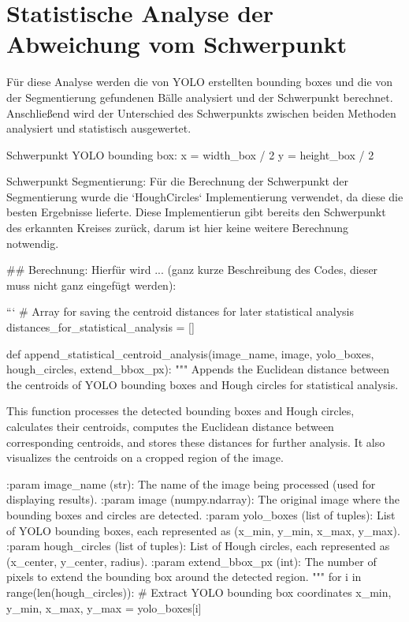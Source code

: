 \section{Statistische Analyse der Abweichung vom Schwerpunkt}

Für diese Analyse werden die von YOLO erstellten bounding boxes und die von der Segmentierung gefundenen Bälle analysiert und der Schwerpunkt berechnet. Anschließend wird der Unterschied des Schwerpunkts zwischen beiden Methoden analysiert und statistisch ausgewertet.

Schwerpunkt YOLO bounding box:
x = width_box / 2
y = height_box / 2


Schwerpunkt Segmentierung:
Für die Berechnung der Schwerpunkt der Segmentierung wurde die `HoughCircles` Implementierung verwendet, da diese die besten Ergebnisse lieferte. Diese Implementierun gibt bereits den Schwerpunkt des erkannten Kreises zurück, darum ist hier keine weitere Berechnung notwendig.


## Berechnung:
Hierfür wird ... (ganz kurze Beschreibung des Codes, dieser muss nicht ganz eingefügt werden):

```
# Array for saving the centroid distances for later statistical analysis
distances_for_statistical_analysis = []

def append_statistical_centroid_analysis(image_name, image, yolo_boxes, hough_circles, extend_bbox_px):
    """
    Appends the Euclidean distance between the centroids of YOLO bounding boxes and Hough circles for statistical analysis.

    This function processes the detected bounding boxes and Hough circles, calculates their centroids,
    computes the Euclidean distance between corresponding centroids, and stores these distances for further analysis.
    It also visualizes the centroids on a cropped region of the image.

    :param image_name (str): The name of the image being processed (used for displaying results).
    :param image (numpy.ndarray): The original image where the bounding boxes and circles are detected.
    :param yolo_boxes (list of tuples): List of YOLO bounding boxes, each represented as (x_min, y_min, x_max, y_max).
    :param hough_circles (list of tuples): List of Hough circles, each represented as (x_center, y_center, radius).
    :param extend_bbox_px (int): The number of pixels to extend the bounding box around the detected region.
    """
    for i in range(len(hough_circles)):
        # Extract YOLO bounding box coordinates
        x_min, y_min, x_max, y_max = yolo_boxes[i]

